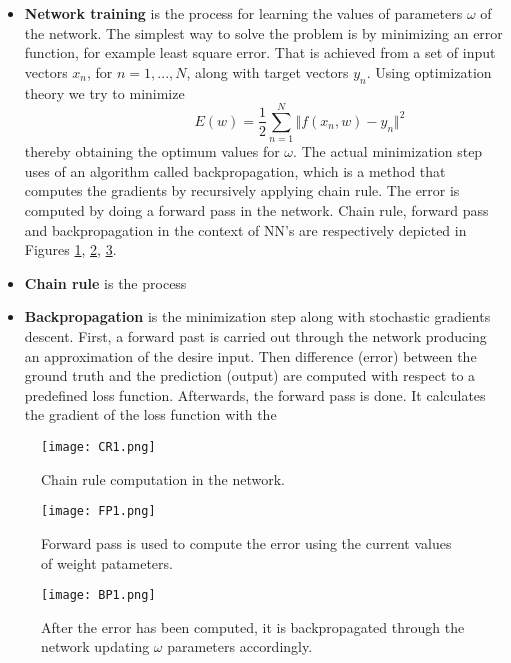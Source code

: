 \begin{itemize}
\item \textbf{Network training} is the process for learning the values of parameters $\omega$ of the network. The simplest way to solve the problem is by minimizing an error function, for example least square error. That is achieved from a set of input vectors $x_n$, for $n = 1,...,N$, along with target vectors $y_n$. Using optimization theory we try to minimize 
\begin{equation} \label{eq:LS1}
\hspace{3em} \hspace{3em} \hspace{3em} E (w) = \frac{1}{2} \sum\limits_{n=1}^N \Vert f(x_n,w) - y_n\Vert^2 \enspace \enspace \hspace{3em}
\end{equation} 
thereby obtaining the optimum values for $\omega$. The actual minimization step uses of an algorithm called backpropagation, which is a method that computes the gradients by recursively applying chain rule. The error is computed by doing a forward pass in the network. Chain rule, forward pass and backpropagation in the context of NN's are respectively depicted in Figures \ref{fig:CRim1}, \ref{fig:FPim1}, \ref{fig:BPim1}.   

\item \textbf{Chain rule} is the process 

\item \textbf{Backpropagation} is the minimization step along with stochastic gradients descent. First, a forward past is carried out through the network producing an approximation of the desire input. Then difference (error) between the ground  truth and the prediction (output) are computed with respect to a predefined loss function. Afterwards, the forward pass is done. It calculates the gradient of the loss function with the   

\end{itemize} 
\begin{figure}[tb] 
\centering 
\texttt{[image: CR1.png]} 
\caption[Chain rule in neural networks]{Chain rule computation in the network.}
\label{fig:CRim1} 
\end{figure}
\begin{figure}[tb] 
\centering 
\texttt{[image: FP1.png]} 
\caption[Forward pass to compute error]{Forward pass is used to compute the error using the current values of weight patameters.}
\label{fig:FPim1} 
\end{figure}
\begin{figure}[tb] 
\centering 
\texttt{[image: BP1.png]} 
\caption[Backpropagation process through the network]{After the error has been computed, it is backpropagated through the network updating $\omega$ parameters accordingly.}
\label{fig:BPim1} 
\end{figure} 	

